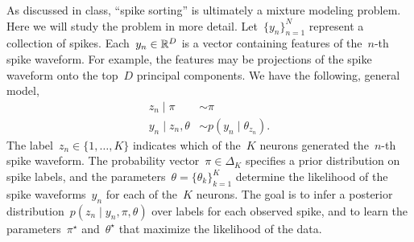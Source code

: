 \documentclass[11pt]{article}
\begin{document}
As discussed in class, ``spike sorting'' is ultimately a mixture modeling problem.  Here we will study the problem in more detail.  Let~$\{y_n\}_{n=1}^N$ represent a collection of spikes.  Each~$y_n \in \mathbb{R}^D$ is a vector containing features of the~$n$-th spike waveform.  For example, the features may be projections of the spike waveform onto the top~$D$ principal components.  We have the following, general model,
\begin{align*}
    z_n \mid \pi &\sim \pi \\
    y_n \mid z_n, \theta &\sim p(y_n \mid \theta_{z_n}).
\end{align*}
The label~$z_n \in \{1,\ldots, K\}$ indicates which of the~$K$ neurons generated the~$n$-th spike waveform.  The probability vector~$\pi \in \Delta_K$ specifies a prior distribution on spike labels, and the parameters~$\theta = \{\theta_k\}_{k=1}^K$ determine the likelihood of the spike waveforms~$y_n$ for each of the~$K$ neurons. The goal is to infer a posterior distribution~$p(z_n \mid y_n, \pi, \theta)$ over labels for each observed spike, and to learn the parameters~$\pi^\star$ and~$\theta^\star$ that maximize the likelihood of the data.
\end{document}
